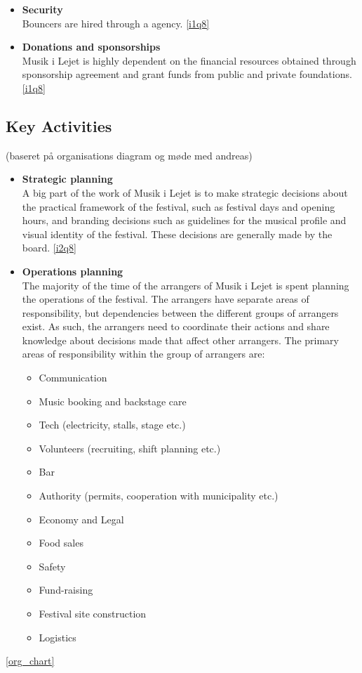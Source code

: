 \begin{itemize}
	\item \textbf{Security}\\
	Bouncers are hired through a agency. \ref{i1q8}
	\item \textbf{Donations and sponsorships}\\
	Musik i Lejet is highly dependent on the financial resources obtained through sponsorship agreement and grant funds from public and private foundations. \ref{i1q8}
\end{itemize}

\subsection{Key Activities} %
\label{sub:key_activities}
(baseret på organisations diagram og møde med andreas)
\begin{itemize}
	\item \textbf{Strategic planning}\\
	A big part of the work of Musik i Lejet is to make strategic decisions about the practical framework of the festival, such as festival days and opening hours, and branding decisions such as guidelines for the musical profile and visual identity of the festival. These decisions are generally made by the board. \ref{i2q8}
	\item \textbf{Operations planning}\\
	The majority of the time of the arrangers of Musik i Lejet is spent planning the operations of the festival. The arrangers have separate areas of responsibility, but dependencies between the different groups of arrangers exist. As such, the arrangers need to coordinate their actions and share knowledge about decisions made that affect other arrangers. The primary areas of responsibility within the group of arrangers are:
	\begin{itemize}
		\item Communication
		\item Music booking and backstage care
		\item Tech (electricity, stalls, stage etc.)
		\item Volunteers (recruiting, shift planning etc.)
		\item Bar
		\item Authority (permits, cooperation with municipality etc.)
		\item Economy and Legal
		\item Food sales
		\item Safety
		\item Fund-raising
		\item Festival site construction
		\item Logistics
	\end{itemize}
\end{itemize} \ref{org_chart}

